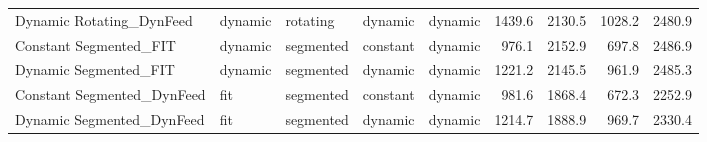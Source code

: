 \begin{tabular}{lllllrrrr}
Dynamic Rotating\_DynFeed     &  dynamic &     rotating &   dynamic &     dynamic &        1439.6 &        2130.5 &        1028.2 &            2480.9 \\
Constant Segmented\_FIT       &  dynamic &    segmented &  constant &     dynamic &         976.1 &        2152.9 &         697.8 &            2486.9 \\
Dynamic Segmented\_FIT        &  dynamic &    segmented &   dynamic &     dynamic &        1221.2 &        2145.5 &         961.9 &            2485.3 \\
Constant Segmented\_DynFeed   &      fit &    segmented &  constant &     dynamic &         981.6 &        1868.4 &         672.3 &            2252.9 \\
Dynamic Segmented\_DynFeed    &      fit &    segmented &   dynamic &     dynamic &        1214.7 &        1888.9 &         969.7 &            2330.4 \\
\bottomrule
\end{tabular}
